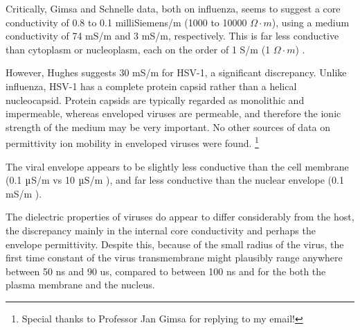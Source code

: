 \documentclass[fleqn,10pt]{paper}
\begin{document}

% 

Critically, Gimsa and Schnelle data, both on influenza, seems to suggest a core conductivity of 0.8 to 0.1 milliSiemens/m (1000 to 10000 $\Omega \cdot m$), using a medium conductivity of 74 mS/m and 3 mS/m, respectively. This is far less conductive than cytoplasm or nucleoplasm, each on the order of 1 S/m (1 $\Omega \cdot m$) \cite{Study2001}. 



However, Hughes suggests 30 mS/m for HSV-1, a significant discrepancy. Unlike influenza, HSV-1 has a complete protein capsid rather than a helical nucleocapsid. Protein capsids are typically regarded as monolithic and impermeable, whereas enveloped viruses are permeable, and therefore the ionic strength of the medium may be very important. No other sources of data on permittivity ion mobility in enveloped viruses were found.  \footnote{Special thanks to Professor Jan Gimsa for replying to my email!}

The viral envelope appears to be slightly less conductive than the cell membrane (0.1 $\micro$S/m \cite{New1999} vs 10 $\micro$S/m \cite{Study2001}), and far less conductive than the nuclear envelope (0.1 $\text{m}$S/m \cite{Study2001}).


The dielectric properties of viruses do appear to differ considerably from the host, the discrepancy mainly in the internal core conductivity and perhaps the envelope permittivity. Despite this, because of the small radius of the virus, the first time constant of the virus transmembrane might plausibly range anywhere between 50 ns and 90 us, compared to between 100 ns and  for the both the plasma membrane and the nucleus.
\end{document}
